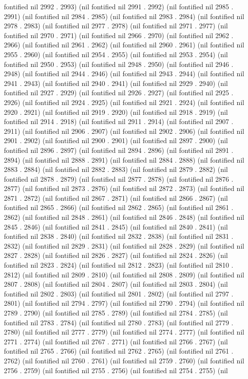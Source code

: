 fontified nil 2992 . 2993) (nil fontified nil 2991 . 2992) (nil fontified nil 2985 . 2991) (nil fontified nil 2984 . 2985) (nil fontified nil 2983 . 2984) (nil fontified nil 2978 . 2983) (nil fontified nil 2977 . 2978) (nil fontified nil 2971 . 2977) (nil fontified nil 2970 . 2971) (nil fontified nil 2966 . 2970) (nil fontified nil 2962 . 2966) (nil fontified nil 2961 . 2962) (nil fontified nil 2960 . 2961) (nil fontified nil 2955 . 2960) (nil fontified nil 2954 . 2955) (nil fontified nil 2953 . 2954) (nil fontified nil 2950 . 2953) (nil fontified nil 2948 . 2950) (nil fontified nil 2946 . 2948) (nil fontified nil 2944 . 2946) (nil fontified nil 2943 . 2944) (nil fontified nil 2941 . 2943) (nil fontified nil 2940 . 2941) (nil fontified nil 2929 . 2940) (nil fontified nil 2927 . 2929) (nil fontified nil 2926 . 2927) (nil fontified nil 2925 . 2926) (nil fontified nil 2924 . 2925) (nil fontified nil 2921 . 2924) (nil fontified nil 2920 . 2921) (nil fontified nil 2919 . 2920) (nil fontified nil 2918 . 2919) (nil fontified nil 2914 . 2918) (nil fontified nil 2911 . 2914) (nil fontified nil 2907 . 2911) (nil fontified nil 2906 . 2907) (nil fontified nil 2902 . 2906) (nil fontified nil 2901 . 2902) (nil fontified nil 2900 . 2901) (nil fontified nil 2897 . 2900) (nil fontified nil 2896 . 2897) (nil fontified nil 2894 . 2896) (nil fontified nil 2891 . 2894) (nil fontified nil 2888 . 2891) (nil fontified nil 2884 . 2888) (nil fontified nil 2883 . 2884) (nil fontified nil 2882 . 2883) (nil fontified nil 2879 . 2882) (nil fontified nil 2878 . 2879) (nil fontified nil 2877 . 2878) (nil fontified nil 2876 . 2877) (nil fontified nil 2873 . 2876) (nil fontified nil 2872 . 2873) (nil fontified nil 2871 . 2872) (nil fontified nil 2867 . 2871) (nil fontified nil 2866 . 2867) (nil fontified nil 2865 . 2866) (nil fontified nil 2862 . 2865) (nil fontified nil 2861 . 2862) (nil fontified nil 2848 . 2861) (nil fontified nil 2846 . 2848) (nil fontified nil 2845 . 2846) (nil fontified nil 2841 . 2845) (nil fontified nil 2840 . 2841) (nil fontified nil 2838 . 2840) (nil fontified nil 2832 . 2838) (nil fontified nil 2831 . 2832) (nil fontified nil 2829 . 2831) (nil fontified nil 2828 . 2829) (nil fontified nil 2827 . 2828) (nil fontified nil 2826 . 2827) (nil fontified nil 2824 . 2826) (nil fontified nil 2823 . 2824) (nil fontified nil 2812 . 2823) (nil fontified nil 2810 . 2812) (nil fontified nil 2809 . 2810) (nil fontified nil 2808 . 2809) (nil fontified nil 2807 . 2808) (nil fontified nil 2804 . 2807) (nil fontified nil 2803 . 2804) (nil fontified nil 2802 . 2803) (nil fontified nil 2801 . 2802) (nil fontified nil 2797 . 2801) (nil fontified nil 2794 . 2797) (nil fontified nil 2790 . 2794) (nil fontified nil 2789 . 2790) (nil fontified nil 2785 . 2789) (nil fontified nil 2784 . 2785) (nil fontified nil 2783 . 2784) (nil fontified nil 2780 . 2783) (nil fontified nil 2779 . 2780) (nil fontified nil 2777 . 2779) (nil fontified nil 2774 . 2777) (nil fontified nil 2771 . 2774) (nil fontified nil 2767 . 2771) (nil fontified nil 2766 . 2767) (nil fontified nil 2765 . 2766) (nil fontified nil 2762 . 2765) (nil fontified nil 2761 . 2762) (nil fontified nil 2760 . 2761) (nil fontified nil 2759 . 2760) (nil fontified nil 2756 . 2759) (nil fontified nil 2755 . 2756) (nil fontified nil 2754 . 2755) (nil 